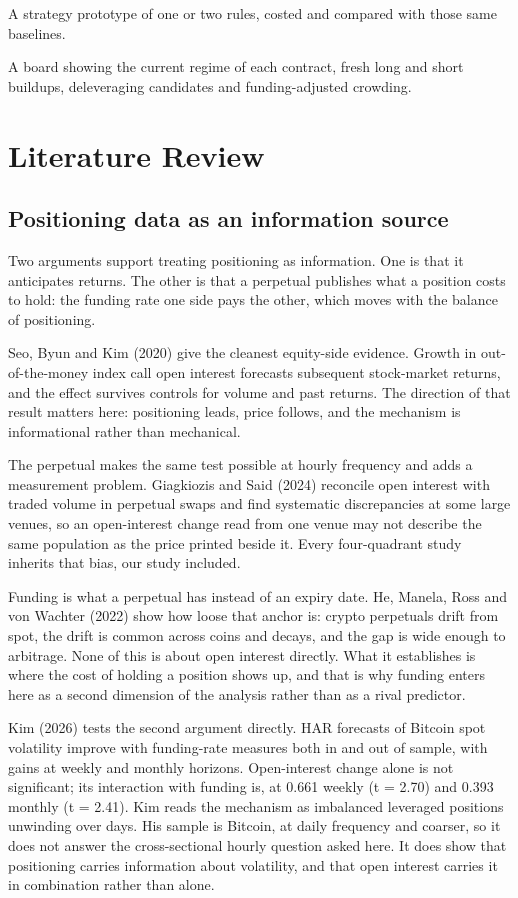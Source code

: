 \documentclass[11pt,a4paper]{article}
\begin{document}
A strategy prototype of one or two rules, costed and compared with those same baselines.

A board showing the current regime of each contract, fresh long and short buildups, deleveraging candidates and funding-adjusted crowding.

\bigskip

\section{Literature Review}

\subsection{Positioning data as an information source}

Two arguments support treating positioning as information. One is that it anticipates returns. The other is that a perpetual publishes what a position costs to hold: the funding rate one side pays the other, which moves with the balance of positioning.

Seo, Byun and Kim (2020) give the cleanest equity-side evidence. Growth in out-of-the-money index call open interest forecasts subsequent stock-market returns, and the effect survives controls for volume and past returns. The direction of that result matters here: positioning leads, price follows, and the mechanism is informational rather than mechanical.

The perpetual makes the same test possible at hourly frequency and adds a measurement problem. Giagkiozis and Said (2024) reconcile open interest with traded volume in perpetual swaps and find systematic discrepancies at some large venues, so an open-interest change read from one venue may not describe the same population as the price printed beside it. Every four-quadrant study inherits that bias, our study included.

Funding is what a perpetual has instead of an expiry date. He, Manela, Ross and von Wachter (2022) show how loose that anchor is: crypto perpetuals drift from spot, the drift is common across coins and decays, and the gap is wide enough to arbitrage. None of this is about open interest directly. What it establishes is where the cost of holding a position shows up, and that is why funding enters here as a second dimension of the analysis rather than as a rival predictor.

Kim (2026) tests the second argument directly. HAR forecasts of Bitcoin spot volatility improve with funding-rate measures both in and out of sample, with gains at weekly and monthly horizons. Open-interest change alone is not significant; its interaction with funding is, at 0.661 weekly (t = 2.70) and 0.393 monthly (t = 2.41). Kim reads the mechanism as imbalanced leveraged positions unwinding over days. His sample is Bitcoin, at daily frequency and coarser, so it does not answer the cross-sectional hourly question asked here. It does show that positioning carries information about volatility, and that open interest carries it in combination rather than alone.
\end{document}
